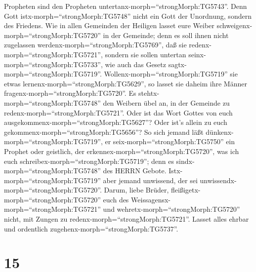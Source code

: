 Propheten sind den Propheten untertanx-morph=``strongMorph:TG5743''.
 Denn Gott istx-morph=``strongMorph:TG5748'' nicht ein Gott
der Unordnung, sondern des Friedens.  Wie in allen
Gemeinden der Heiligen lasset eure Weiber
schweigenx-morph=``strongMorph:TG5720'' in der Gemeinde; denn es soll
ihnen nicht zugelassen werdenx-morph=``strongMorph:TG5769'', daß sie
redenx-morph=``strongMorph:TG5721'', sondern sie sollen untertan
seinx-morph=``strongMorph:TG5733'', wie auch das Gesetz
sagtx-morph=``strongMorph:TG5719''. 
Wollenx-morph=``strongMorph:TG5719'' sie etwas
lernenx-morph=``strongMorph:TG5629'', so lasset sie daheim ihre Männer
fragenx-morph=``strongMorph:TG5720''. Es
stehtx-morph=``strongMorph:TG5748'' den Weibern übel an, in der Gemeinde
zu redenx-morph=``strongMorph:TG5721''.  Oder ist das Wort
Gottes von euch ausgekommenx-morph=``strongMorph:TG5627''? Oder ist's
allein zu euch gekommenx-morph=``strongMorph:TG5656''?  So
sich jemand läßt dünkenx-morph=``strongMorph:TG5719'', er
seix-morph=``strongMorph:TG5750'' ein Prophet oder geistlich, der
erkennex-morph=``strongMorph:TG5720'', was ich euch
schreibex-morph=``strongMorph:TG5719''; denn es
sindx-morph=``strongMorph:TG5748'' des HERRN Gebote. 
Istx-morph=``strongMorph:TG5719'' aber jemand unwissend, der sei
unwissendx-morph=``strongMorph:TG5720''.  Darum, liebe
Brüder, fleißigetx-morph=``strongMorph:TG5720'' euch des
Weissagensx-morph=``strongMorph:TG5721'' und
wehretx-morph=``strongMorph:TG5720'' nicht, mit Zungen zu
redenx-morph=``strongMorph:TG5721''.  Lasset alles ehrbar
und ordentlich zugehenx-morph=``strongMorph:TG5737''.

\hypertarget{section-14}{%
\section{15}\label{section-14}}

